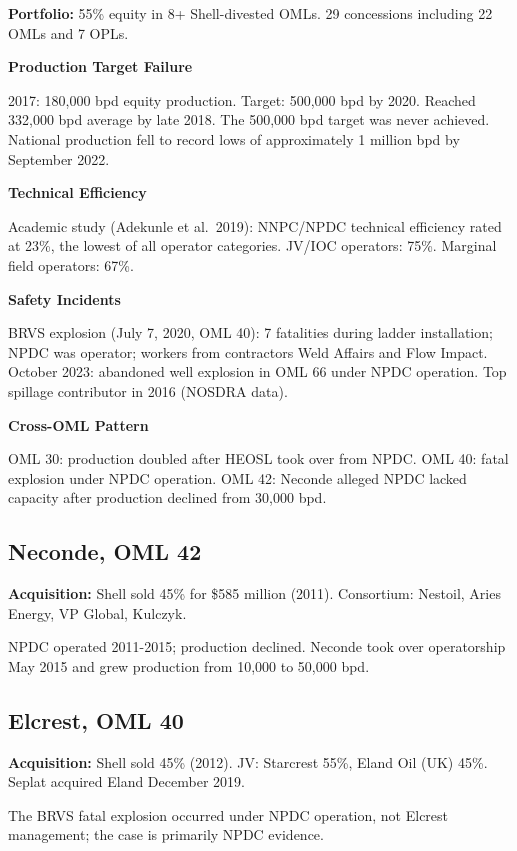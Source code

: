 \textbf{Portfolio:} 55\% equity in 8+ Shell-divested OMLs. 29
concessions including 22 OMLs and 7 OPLs.

\textbf{Production Target Failure}

2017: 180,000 bpd equity production. Target: 500,000 bpd by 2020.
Reached 332,000 bpd average by late 2018. The 500,000 bpd target was
never achieved. National production fell to record lows of approximately
1 million bpd by September 2022.

\textbf{Technical Efficiency}

Academic study (Adekunle et al.~2019): NNPC/NPDC technical efficiency
rated at 23\%, the lowest of all operator categories. JV/IOC operators:
75\%. Marginal field operators: 67\%.

\textbf{Safety Incidents}

BRVS explosion (July 7, 2020, OML 40): 7 fatalities during ladder
installation; NPDC was operator; workers from contractors Weld Affairs
and Flow Impact. October 2023: abandoned well explosion in OML 66 under
NPDC operation. Top spillage contributor in 2016 (NOSDRA data).

\textbf{Cross-OML Pattern}

OML 30: production doubled after HEOSL took over from NPDC. OML 40:
fatal explosion under NPDC operation. OML 42: Neconde alleged NPDC
lacked capacity after production declined from 30,000 bpd.

\hypertarget{neconde-oml-42}{%
\subsection{Neconde, OML 42}\label{neconde-oml-42}}

\textbf{Acquisition:} Shell sold 45\% for \$585 million (2011).
Consortium: Nestoil, Aries Energy, VP Global, Kulczyk.

NPDC operated 2011-2015; production declined. Neconde took over
operatorship May 2015 and grew production from 10,000 to 50,000 bpd.

\hypertarget{elcrest-oml-40}{%
\subsection{Elcrest, OML 40}\label{elcrest-oml-40}}

\textbf{Acquisition:} Shell sold 45\% (2012). JV: Starcrest 55\%, Eland
Oil (UK) 45\%. Seplat acquired Eland December 2019.

The BRVS fatal explosion occurred under NPDC operation, not Elcrest
management; the case is primarily NPDC evidence.

